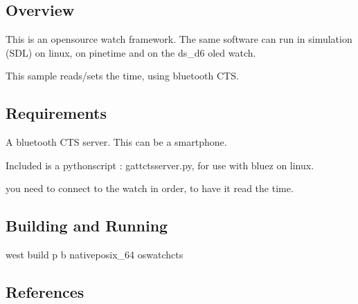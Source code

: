 \documentclass[letterpaper,10pt,english]{sphinxmanual}
\begin{document}
\subsection{Overview}
\label{\detokenize{samples/oswatch-ctsREADME:overview}}
This is an opensource watch framework.
The same software can run in simulation (SDL) on linux, on pinetime and on the ds\_d6 oled watch.

This sample reads/sets the time, using bluetooth CTS.


\subsection{Requirements}
\label{\detokenize{samples/oswatch-ctsREADME:requirements}}
A bluetooth CTS server.
This can be a smartphone.

Included is a python\sphinxhyphen{}script : gatt\sphinxhyphen{}cts\sphinxhyphen{}server.py, for use with bluez on linux.

\begin{sphinxVerbatim}[commandchars=\\\{\}]
 
\end{sphinxVerbatim}

you need to connect to the watch in order, to have it read the time.

\begin{sphinxVerbatim}[commandchars=\\\{\}]
      
      
\end{sphinxVerbatim}


\subsection{Building and Running}
\label{\detokenize{samples/oswatch-ctsREADME:building-and-running}}
west build \sphinxhyphen{}p \sphinxhyphen{}b  native\sphinxhyphen{}posix\_64 oswatch\sphinxhyphen{}cts


\subsection{References}
\label{\detokenize{samples/oswatch-ctsREADME:references}}
\end{document}
